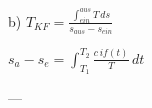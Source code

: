 b)  
\( T_{KF} = \frac{\int_{ein}^{aus} T \, ds}{s_{aus} - s_{ein}} \)  

\( s_a - s_e = \int_{T_1}^{T_2} \frac{c \, if (t)}{T} \, dt \)  

---